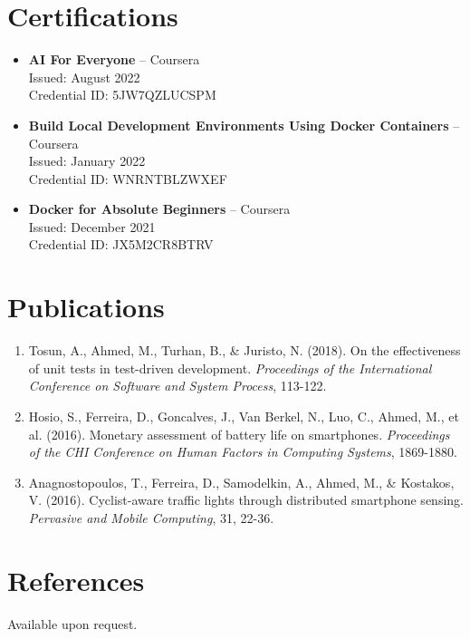 \documentclass[12pt]{article}
\begin{document}
\section{Certifications}

\begin{itemize}[leftmargin=1.5em]
    \item \textbf{AI For Everyone} -- Coursera \\
    Issued: August 2022 \\
    Credential ID: 5JW7QZLUCSPM
    \item \textbf{Build Local Development Environments Using Docker Containers} -- Coursera \\
    Issued: January 2022 \\
    Credential ID: WNRNTBLZWXEF
    \item \textbf{Docker for Absolute Beginners} -- Coursera \\
    Issued: December 2021 \\
    Credential ID: JX5M2CR8BTRV
\end{itemize}

\section{Publications}

\begin{enumerate}[leftmargin=1.5em]
    \item Tosun, A., Ahmed, M., Turhan, B., \& Juristo, N. (2018). On the effectiveness of unit tests in test-driven development. \textit{Proceedings of the International Conference on Software and System Process}, 113-122.
    \item Hosio, S., Ferreira, D., Goncalves, J., Van Berkel, N., Luo, C., Ahmed, M., et al. (2016). Monetary assessment of battery life on smartphones. \textit{Proceedings of the CHI Conference on Human Factors in Computing Systems}, 1869-1880.
    \item Anagnostopoulos, T., Ferreira, D., Samodelkin, A., Ahmed, M., \& Kostakos, V. (2016). Cyclist-aware traffic lights through distributed smartphone sensing. \textit{Pervasive and Mobile Computing}, 31, 22-36.
\end{enumerate}

\section{References}

Available upon request.
\end{document}
